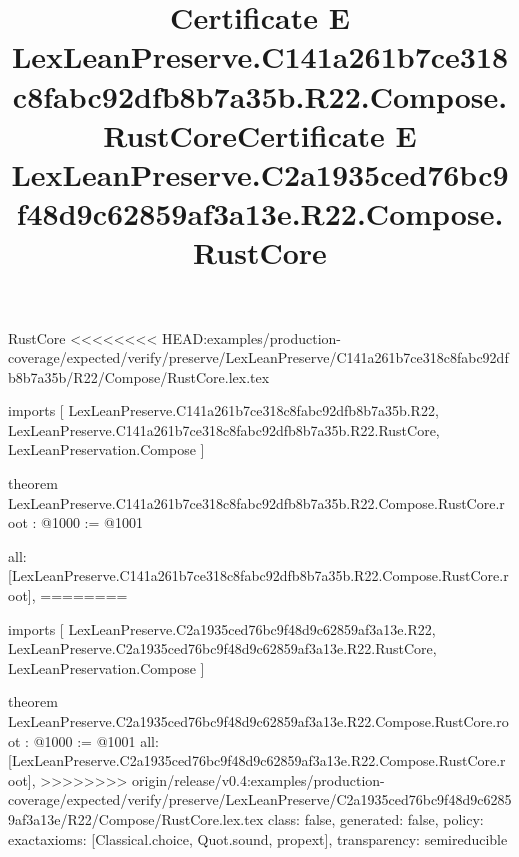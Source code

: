 \begin{lexlean}{RustCore}
<<<<<<<< HEAD:examples/production-coverage/expected/verify/preserve/LexLeanPreserve/C141a261b7ce318c8fabc92dfb8b7a35b/R22/Compose/RustCore.lex.tex
\title{Certificate E LexLeanPreserve.C141a261b7ce318c8fabc92dfb8b7a35b.R22.Compose.RustCore}
\begin{coremodule}
imports [
  LexLeanPreserve.C141a261b7ce318c8fabc92dfb8b7a35b.R22,
  LexLeanPreserve.C141a261b7ce318c8fabc92dfb8b7a35b.R22.RustCore,
  LexLeanPreservation.Compose
]

theorem LexLeanPreserve.C141a261b7ce318c8fabc92dfb8b7a35b.R22.Compose.RustCore.root : @1000 := @1001 {
  all: [LexLeanPreserve.C141a261b7ce318c8fabc92dfb8b7a35b.R22.Compose.RustCore.root],
========
\title{Certificate E LexLeanPreserve.C2a1935ced76bc9f48d9c62859af3a13e.R22.Compose.RustCore}
\begin{coremodule}
imports [
  LexLeanPreserve.C2a1935ced76bc9f48d9c62859af3a13e.R22,
  LexLeanPreserve.C2a1935ced76bc9f48d9c62859af3a13e.R22.RustCore,
  LexLeanPreservation.Compose
]

theorem LexLeanPreserve.C2a1935ced76bc9f48d9c62859af3a13e.R22.Compose.RustCore.root : @1000 := @1001 {
  all: [LexLeanPreserve.C2a1935ced76bc9f48d9c62859af3a13e.R22.Compose.RustCore.root],
>>>>>>>> origin/release/v0.4:examples/production-coverage/expected/verify/preserve/LexLeanPreserve/C2a1935ced76bc9f48d9c62859af3a13e/R22/Compose/RustCore.lex.tex
  class: false,
  generated: false,
  policy: exact{axioms: [Classical.choice, Quot.sound, propext]},
  transparency: semireducible
}


\end{coremodule}}
\end{coremodule}
\end{lexlean}
